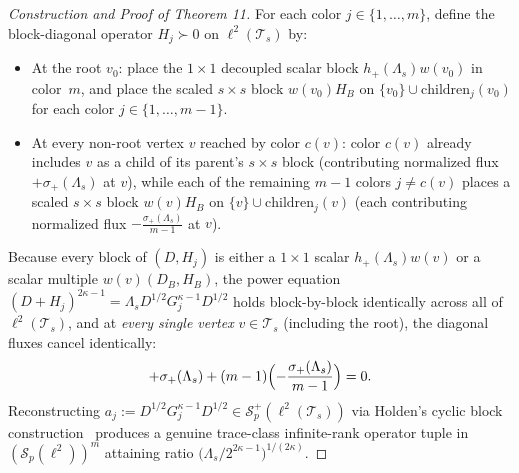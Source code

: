 \documentclass[10pt,letterpaper]{article}
\newcommand{\Sp}{\mathcal{S}_p}
\begin{document}
\begin{proof}[Construction and Proof of Theorem 11]
For each color $j \in \{1,\dots,m\}$, define the block-diagonal operator $H_j \succ 0$ on $\ell^2(\mathcal{T}_s)$ by:
\begin{itemize}[leftmargin=1.5em,itemsep=1.5pt]
  \item At the root $v_0$: place the $1\times 1$ decoupled scalar block $h_+(\Lambda_s) w(v_0)$ in color~$m$, and place the scaled $s\times s$ block $w(v_0) H_B$ on $\{v_0\} \cup \text{children}_j(v_0)$ for each color $j \in \{1,\dots,m-1\}$.
  \item At every non-root vertex $v$ reached by color $c(v)$: color $c(v)$ already includes $v$ as a child of its parent's $s\times s$ block (contributing normalized flux $+\sigma_+(\Lambda_s)$ at $v$), while each of the remaining $m - 1$ colors $j \neq c(v)$ places a scaled $s\times s$ block $w(v) H_B$ on $\{v\} \cup \text{children}_j(v)$ (each contributing normalized flux $-\frac{\sigma_+(\Lambda_s)}{m-1}$ at $v$).
\end{itemize}
Because every block of $(D, H_j)$ is either a $1\times 1$ scalar $h_+(\Lambda_s) w(v)$ or a scalar multiple $w(v)(D_B, H_B)$, the power equation $(D + H_j)^{2\kappa-1} = \Lambda_s D^{1/2} G_j^{\kappa-1} D^{1/2}$ holds block-by-block identically across all of $\ell^2(\mathcal{T}_s)$, and at \emph{every single vertex} $v \in \mathcal{T}_s$ (including the root), the diagonal fluxes cancel identically:
\[
  +\sigma_+(\Lambda_s) + (m - 1)\Bigl(-\frac{\sigma_+(\Lambda_s)}{m - 1}\Bigr) = 0.
\]
Reconstructing $a_j := D^{1/2} G_j^{\kappa-1} D^{1/2} \in \mathcal{S}_p^+(\ell^2(\mathcal{T}_s))$ via Holden's cyclic block construction~\cite[Prop.~2.2]{Holden2026b} produces a genuine trace-class infinite-rank operator tuple in $(\Sp(\ell^2))^m$ attaining ratio $\bigl(\Lambda_s / 2^{2\kappa-1}\bigr)^{1/(2\kappa)}$.


\end{proof}
\end{document}
